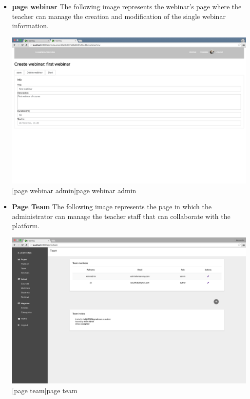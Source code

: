 \begin{itemize}
\item \textbf{page webinar} The following image represents the webinar's page where the teacher can manage the creation and modification of the single webinar information.\par

\begin{minipage}{\linewidth}
    \centering
    \includegraphics[width=1.0\linewidth]{images/chapter4/page-webinar-admin.png}
    [page webinar admin]{page webinar admin}
\end{minipage}

\item \textbf{Page Team} The following image represents the page in which the administrator can manage the teacher staff that can collaborate with the platform.\par

\begin{minipage}{\linewidth}
    \centering
    \includegraphics[width=1.0\linewidth]{images/chapter4/page-team-admin.png}
    [page team]{page team}
\end{minipage}


\end{itemize}
